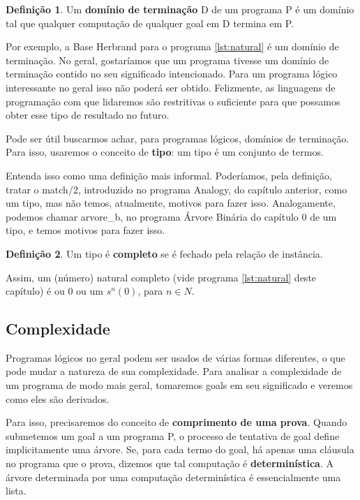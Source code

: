 \documentclass{article}
\theoremstyle{definition}
\newtheorem{definition}{Definição}[section]
\theoremstyle{remark}
\begin{document}
\begin{definition}
  Um \textbf{domínio de terminação} D de um programa P é um domínio tal que qualquer computação de qualquer goal em D termina em P.
\end{definition}

Por exemplo, a Base Herbrand para o programa \ref{lst:natural} é um domínio de terminação.
No geral, gostaríamos que um programa tivesse um domínio de terminação contido no seu significado intencionado. Para um programa lógico interessante no geral isso não poderá ser obtido. Felizmente, as linguagens de programação com que lidaremos são restritivas o suficiente para que possamos obter esse tipo de resultado no futuro.

Pode ser útil buscarmos achar, para programas lógicos, domínios de terminação. Para isso, usaremos o conceito de \textbf{tipo}: um tipo é um conjunto de termos.

Entenda isso como uma definição mais informal. Poderíamos, pela definição, tratar o match/2, introduzido no programa Analogy, do capítulo anterior, como um tipo, mas não temos, atualmente, motivos para fazer isso.
Analogamente, podemos chamar arvore\_b, no programa Árvore Binária do capítulo 0 de um tipo, %
e temos motivos para fazer isso.

\begin{definition} Um tipo é \textbf{completo} se é fechado pela relação de instância.
\end{definition}

Assim, um (número) natural completo (vide programa \ref{lst:natural} deste capítulo) é ou 0 ou um $s^n(0)$, para $n \in N$.

\subsection{Complexidade}

Programas lógicos no geral podem ser usados de várias formas diferentes, o que pode mudar a natureza de sua complexidade. Para analisar a complexidade de um programa de modo mais geral, tomaremos goals em seu significado e veremos como eles são derivados.

Para isso, precisaremos do conceito de \textbf{comprimento de uma prova}. Quando submetemos um goal a um programa P, o processo de tentativa de goal define implicitamente uma árvore. Se, para cada termo do goal, há apenas uma cláusula no programa que o prova, dizemos que tal computação é \textbf{determinística}. A árvore determinada por uma computação determinística é essencialmente uma lista.
\end{document}
